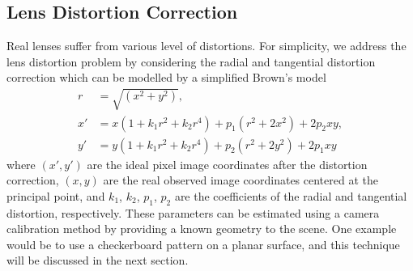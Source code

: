 \subsection{Lens Distortion Correction}
Real lenses suffer from various level of distortions. For simplicity, we address the lens distortion problem by considering the radial and tangential distortion correction which can be modelled by a simplified Brown's model~\cite{brown1966decentering}
\begin{equation}
\begin{split}
r &= \sqrt{(x^2+y^2)}, \\
x' &= x(1+k_1 r^2+k_2 r^4)+p_1(r^2+2x^2)+2p_2xy, \\
y' &= y(1+k_1 r^2+k_2 r^4)+p_2(r^2+2y^2)+2p_1xy
\label{eq_lens_distortion}
\end{split}
\end{equation}
where $(x', y')$ are the ideal pixel image coordinates after the distortion correction, $(x, y)$ are the real observed image coordinates centered at the principal point, and $k_{1}$, $k_{2}$, $p_1$, $p_2$ are the coefficients of the radial and tangential distortion, respectively.  These parameters can be estimated using a camera calibration method by providing a known geometry to the scene. One example would be to use a checkerboard pattern on a planar surface, and this technique will be discussed in the next section.

